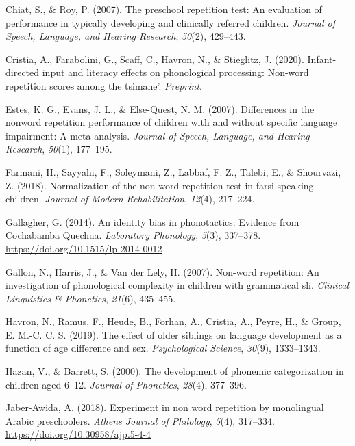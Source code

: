 \documentclass[english,,man,floatsintext]{apa6}
\begin{document}
\leavevmode\hypertarget{ref-chiat2007preschool}{}%
Chiat, S., \& Roy, P. (2007). The preschool repetition test: An evaluation of performance in typically developing and clinically referred children. \emph{Journal of Speech, Language, and Hearing Research}, \emph{50}(2), 429--443.

\leavevmode\hypertarget{ref-cristia2020infant}{}%
Cristia, A., Farabolini, G., Scaff, C., Havron, N., \& Stieglitz, J. (2020). Infant-directed input and literacy effects on phonological processing: Non-word repetition scores among the tsimane'. \emph{Preprint}.

\leavevmode\hypertarget{ref-estes2007differences}{}%
Estes, K. G., Evans, J. L., \& Else-Quest, N. M. (2007). Differences in the nonword repetition performance of children with and without specific language impairment: A meta-analysis. \emph{Journal of Speech, Language, and Hearing Research}, \emph{50}(1), 177--195.

\leavevmode\hypertarget{ref-farmani2018normalization}{}%
Farmani, H., Sayyahi, F., Soleymani, Z., Labbaf, F. Z., Talebi, E., \& Shourvazi, Z. (2018). Normalization of the non-word repetition test in farsi-speaking children. \emph{Journal of Modern Rehabilitation}, \emph{12}(4), 217--224.

\leavevmode\hypertarget{ref-gallagher2014identity}{}%
Gallagher, G. (2014). An identity bias in phonotactics: Evidence from Cochabamba Quechua. \emph{Laboratory Phonology}, \emph{5}(3), 337--378. \url{https://doi.org/10.1515/lp-2014-0012}

\leavevmode\hypertarget{ref-gallon2007non}{}%
Gallon, N., Harris, J., \& Van der Lely, H. (2007). Non-word repetition: An investigation of phonological complexity in children with grammatical sli. \emph{Clinical Linguistics \& Phonetics}, \emph{21}(6), 435--455.

\leavevmode\hypertarget{ref-havron2019effect}{}%
Havron, N., Ramus, F., Heude, B., Forhan, A., Cristia, A., Peyre, H., \& Group, E. M.-C. C. S. (2019). The effect of older siblings on language development as a function of age difference and sex. \emph{Psychological Science}, \emph{30}(9), 1333--1343.

\leavevmode\hypertarget{ref-hazan2000development}{}%
Hazan, V., \& Barrett, S. (2000). The development of phonemic categorization in children aged 6--12. \emph{Journal of Phonetics}, \emph{28}(4), 377--396.

\leavevmode\hypertarget{ref-jabere2018xperiment}{}%
Jaber-Awida, A. (2018). Experiment in non word repetition by monolingual Arabic preschoolers. \emph{Athens Journal of Philology}, \emph{5}(4), 317--334. \url{https://doi.org/10.30958/ajp.5-4-4}
\end{document}
